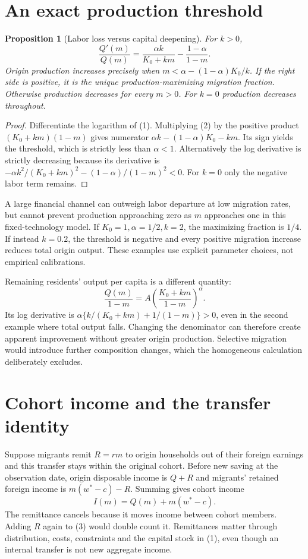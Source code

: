 \documentclass[11pt,a4paper]{article}
\newtheorem{proposition}[theorem]{Proposition}
\begin{document}
\section{An exact production threshold}
\begin{proposition}[Labor loss versus capital deepening]
For $k>0$,
\[
 \frac{Q'(m)}{Q(m)}
       =\frac{\alpha k}{K_0+km}-\frac{1-\alpha}{1-m}. \tag{2}
\]
Origin production increases precisely when
$m<\alpha-(1-\alpha)K_0/k$.
If the right side is positive, it is the unique production-maximizing migration fraction. Otherwise production decreases for every $m>0$. For $k=0$ production decreases throughout.
\end{proposition}
\begin{proof}
Differentiate the logarithm of (1). Multiplying (2) by the positive product $(K_0+km)(1-m)$ gives numerator
$\alpha k-(1-\alpha)K_0-km$. Its sign yields the threshold, which is strictly less than $\alpha<1$. Alternatively the log derivative is strictly decreasing because its derivative is
$-\alpha k^2/(K_0+km)^2-(1-\alpha)/(1-m)^2<0$.
For $k=0$ only the negative labor term remains.
\end{proof}

A large financial channel can outweigh labor departure at low migration rates, but cannot prevent production approaching zero as $m$ approaches one in this fixed-technology model. If $K_0=1,\alpha=1/2,k=2$, the maximizing fraction is $1/4$. If instead $k=0.2$, the threshold is negative and every positive migration increase reduces total origin output. These examples use explicit parameter choices, not empirical calibrations.

Remaining residents' output per capita is a different quantity:
\[
 \frac{Q(m)}{1-m}=A\left(\frac{K_0+km}{1-m}\right)^\alpha.
\]
Its log derivative is $\alpha\{k/(K_0+km)+1/(1-m)\}>0$, even in the second example where total output falls. Changing the denominator can therefore create apparent improvement without greater origin production. Selective migration would introduce further composition changes, which the homogeneous calculation deliberately excludes.

\section{Cohort income and the transfer identity}
Suppose migrants remit $R=rm$ to origin households out of their foreign earnings and this transfer stays within the original cohort. Before new saving at the observation date, origin disposable income is $Q+R$ and migrants' retained foreign income is $m(w^*-c)-R$. Summing gives cohort income
\[
 I(m)=Q(m)+m(w^*-c).                                 \tag{3}
\]
The remittance cancels because it moves income between cohort members. Adding $R$ again to (3) would double count it. Remittances matter through distribution, costs, constraints and the capital stock in (1), even though an internal transfer is not new aggregate income.
\end{document}
